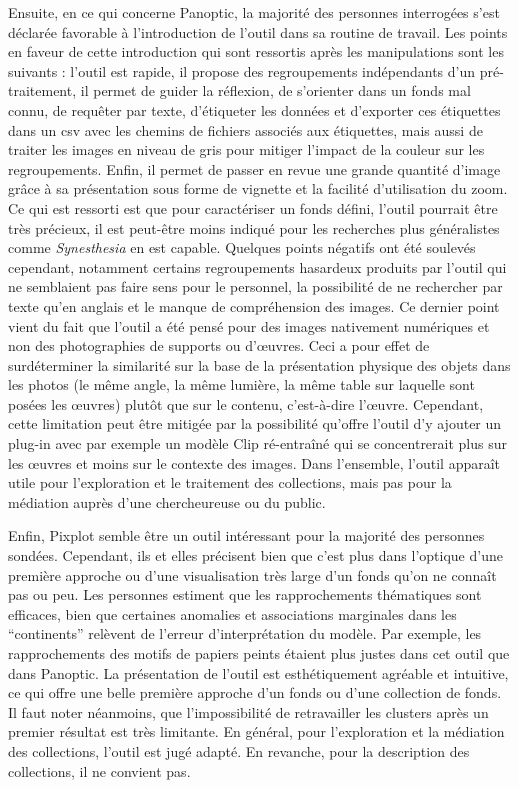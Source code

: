 Ensuite, en ce qui concerne Panoptic, la majorité des personnes interrogées s'est déclarée favorable à l'introduction de l'outil dans sa routine de travail. Les points en faveur de cette introduction qui sont ressortis après les manipulations sont les suivants : l'outil est rapide, il propose des regroupements indépendants d'un pré-traitement, il permet de guider la réflexion, de s'orienter dans un fonds mal connu, de requêter par texte, d'étiqueter les données et d'exporter ces étiquettes dans un csv avec les chemins de fichiers associés aux étiquettes, mais aussi de traiter les images en niveau de gris pour mitiger l'impact de la couleur sur les regroupements. Enfin, il permet de passer en revue une grande quantité d'image grâce à sa présentation sous forme de vignette et la facilité d'utilisation du zoom. Ce qui est ressorti est que pour caractériser un fonds défini, l'outil pourrait être très précieux, il est peut-être moins indiqué pour les recherches plus généralistes comme \textit{Synesthesia} en est capable. Quelques points négatifs ont été soulevés cependant, notamment certains regroupements hasardeux produits par l'outil qui ne semblaient pas faire sens pour le personnel, la possibilité de ne rechercher par texte qu'en anglais et le manque de compréhension des images. Ce dernier point vient du fait que l'outil a été pensé pour des images nativement numériques et non des photographies de supports ou d’œuvres. Ceci a pour effet de surdéterminer la similarité sur la base de la présentation physique des objets dans les photos (le même angle, la même lumière, la même table sur laquelle sont posées les œuvres) plutôt que sur le contenu, c'est-à-dire l’œuvre. Cependant, cette limitation peut être mitigée par la possibilité qu'offre l'outil d'y ajouter un plug-in avec par exemple un modèle Clip ré-entraîné qui se concentrerait plus sur les œuvres et moins sur le contexte des images. Dans l'ensemble, l'outil apparaît utile pour l'exploration et le traitement des collections, mais pas pour la médiation auprès d'un\wokisme e chercheur\wokisme euse ou du public.

Enfin, Pixplot semble être un outil intéressant pour la majorité des personnes sondées. Cependant, ils et elles précisent bien que c'est plus dans l'optique d'une première approche ou d'une visualisation très large d'un fonds qu'on ne connaît pas ou peu. Les personnes estiment que les rapprochements thématiques sont efficaces, bien que certaines anomalies et associations marginales dans les \enquote{continents} relèvent de l'erreur d'interprétation du modèle. Par exemple, les rapprochements des motifs de papiers peints étaient plus justes dans cet outil que dans Panoptic. La présentation de l'outil est esthétiquement agréable et intuitive, ce qui offre une belle première approche d'un fonds ou d'une collection de fonds. Il faut noter néanmoins, que l'impossibilité de retravailler les clusters après un premier résultat est très limitante. En général, pour l'exploration et la médiation des collections, l'outil est jugé adapté. En revanche, pour la description des collections, il ne convient pas.

